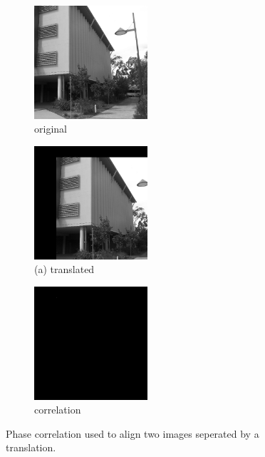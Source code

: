\begin{figure}[t!] 
        \centering
        \begin{subfigure}[b]{4.5cm}
                \includegraphics[width=4.2cm]{images/pc/original}
                \caption{original}
                \label{fig:PCSecORY}
        \end{subfigure}%
        \begin{subfigure}[b]{4.5cm}
                \includegraphics[width=4.2cm]{images/pc/translated}
                \caption{(a) translated}
                \label{fig:PCSectrans}
        \end{subfigure}%
                \begin{subfigure}[b]{4.5cm}
                \includegraphics[width=4.2cm]{images/pc/phasecorrelation1}
                \caption{correlation}
                \label{fig:PCSecCCPC}
        \end{subfigure}%
       \caption{Phase correlation used to align two images seperated by a translation.}\label{fig:PCSecCC}
\end{figure}

